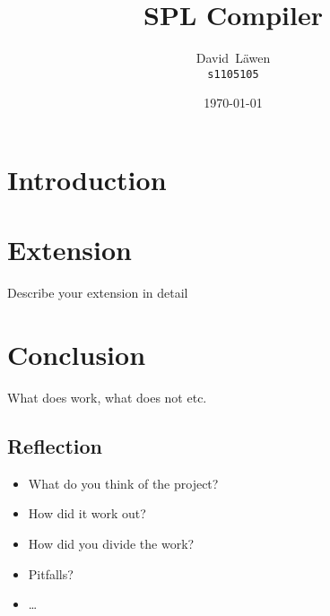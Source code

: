 \documentclass{report}
\author{%
	David~L\"awen\\
	\small\texttt{s1105105}
}
\date{\today}
\title{SPL Compiler}
\begin{document}
\maketitle%

\tableofcontents%

\chapter{Introduction}









\chapter{Extension}
Describe your extension in detail

\chapter{Conclusion}
What does work, what does not etc.

\section{Reflection}
\begin{itemize}
	\item What do you think of the project?
	\item How did it work out?
	\item How did you divide the work?
	\item Pitfalls?
	\item \ldots
\end{itemize}
\end{document}
